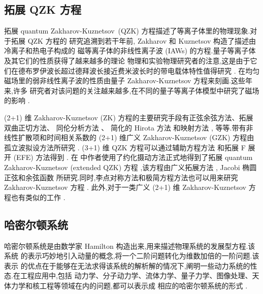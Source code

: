 \subsection{拓展 QZK 方程}

拓展 quantum Zakharov-Kuznetsov~(QZK) 方程描述了等离子体里的物理现象.对于拓展 QZK 方程的
研究追溯到若干年前, Zakharov 和 Kuznetsov \cite{abdou2011quant} 构造了描述由冷离子和热电子构成的
磁等离子体的非线性离子波 (IAWs) 的方程.量子等离子体及其它们的性质获得了越来越多的理论
物理和实验物理研究者的注意,这是由于它们在德布罗伊波长超过德拜波长接近费米波长时的带电载体特性值得研究 \cite{abdou2011quant,ahmed2013kinks,bhrawy2013soli,biswas20091soli,biswas2013soli,bluman2010appli,elganaini2011tra,godleswski2004the,guner2015bright,ibragimov2006inte}. 在均匀磁场里的弱非线性离子波的性质由量子 Zakharov-Kuznetsov 方程来刻画.这些年来,许多
研究者对该问题的关注越来越多,在不同的量子等离子体模型中研究了磁场的影响 \cite{ibragimov2007anew,iwasaki1990cylin,johnpilai2011sym,khan2008linear,krishnan2010sol,leveque1992num,linares2009well,linares2011local,morris2013soli,moslem2007soli,mothibi2015con,moussa2001simi,munro2014con,munro2000sta,mushtaq2005non,olver2000app,peng2008exact,sabry2009non}.

(2+1) 维 Zakharov-Kuznetsov (ZK) 方程的主要研究手段有正弦余弦方法、拓展双曲正切方法、
同伦分析方法 \cite{linares2009well}、 简化的 Hirota 方法 \cite{biswas2013soli,bluman2010appli}
和映射方法 \cite{morris2013soli}, 等等.带有非线性扩散项和时间相关系数的 (2+1) 维广义
Zakharov-Kuznetsov (GZK) 方程由孤立波拟设方法所研究 \cite{sabry2009non}. (3+1) 维 QZK
方程可以通过辅助方程方法 \cite{ahmed2013kinks} 和拓展 F 展开 (EFE) 方法得到 \cite{munro2000sta}.
在 \cite{ahmed2013kinks} 中作者使用了约化摄动方法正式地得到了拓展 quantum Zakharov-Kuznetsov (extended QZK) 方程
,该方程由广义拓展方法 \cite{guner2015bright}, Jacobi 椭圆正弦和余弦函数 \cite{biswas20091soli}
所研究.同时,李点对称方法和极简方程方法也可以用来研究 Zakharov-Kuznetsov 方程 \cite{leveque1992num}.
此外,对于一类广义 (2+1) 维 Zakharov-Kuznetsov 方程也有类似的工作 \cite{moslem2007soli}.

\subsection{哈密尔顿系统}

哈密尔顿系统是由数学家 Hamilton 构造出来,用来描述物理系统的发展型方程.该系统
的表示巧妙地引入动量的概念,将一个二阶问题转化为维数加倍的一阶问题.该表示
的优点在于能够在无法求得该系统的解析解的情况下,阐明一些动力系统的性态.在工程应用中,包括
动力学、分子动力学、流体力学、量子力学、图像处理、天体力学和核工程等领域在内的问题,都可以表示成
相应的哈密尔顿系统的形式 \cite{arieh2009afirst}.

